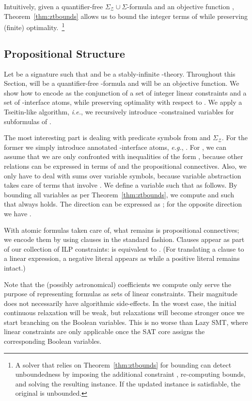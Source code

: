 \documentclass{llncs}
\newcommand{\ie}[0]{\emph{i.e.}, }
\newcommand{\eg}[0]{\emph{e.g.}, }
\newcommand{\SigmaZ}[0]{\ensuremath{\Sigma_{\mathcal{Z}}}}
\newcommand{\SigmaZT}[0]{\ensuremath{\SigmaZ{} \cup \Sigma}}
\begin{document}
Intuitively, given a quantifier-free \SigmaZT{}-formula  and an
objective function , Theorem~\ref{thm:ztbounds} allows us to bound
the integer terms of  while preserving (finite)
optimality.~\footnote{A solver that relies on
  Theorem~\ref{thm:ztbounds} for bounding can detect unboundedness by
  imposing the additional constraint , re-computing bounds,
  and solving the resulting instance. If the updated instance is
  satisfiable, the original is unbounded.}

\subsection{Propositional Structure}
\label{sec:smt:prop}

Let  be a signature such that  and  be a stably-infinite -theory. Throughout
this Section,  will be a quantifier-free -formula and 
will be an objective function. We show how to encode  as the
conjunction of a set  of integer linear constraints and a set 
of -interface atoms, while preserving optimality with respect
to . We apply a Tseitin-like algorithm, \ie we recursively
introduce -constrained variables for subformulas of .

The most interesting part is dealing with predicate symbols from
 and \SigmaZ{}. For the former we simply introduce annotated
-interface atoms, \eg . For , we can assume
that we are only confronted with inequalities of the form , because other relations can be
expressed in terms of  and the propositional connectives. Also,
we only have to deal with sums over variable symbols, because variable
abstraction takes care of terms that involve . We define a
variable  such that  as
follows. By bounding all variables as per Theorem~\ref{thm:ztbounds},
we compute  and  such that 
always holds.  The direction  can be
expressed as ; for the opposite direction we have .

With atomic formulas taken care of, what remains is propositional
connectives; we encode them by using clauses in the standard
fashion. Clauses appear as part of our collection of ILP constraints:
 is equivalent to . (For translating a
clause to a linear expression, a negative literal  appears
as  while a positive literal remains intact.)

Note that the (possibly astronomical) coefficients we compute only
serve the purpose of representing formulas as sets of linear
constraints. Their magnitude does not necessarily have algorithmic
side-effects. In the worst case, the initial continuous relaxation
will be weak, but relaxations will become stronger once we start
branching on the Boolean variables. This is no worse than Lazy SMT,
where linear constraints are only applicable once the SAT core assigns
the corresponding Boolean variables.
\end{document}
